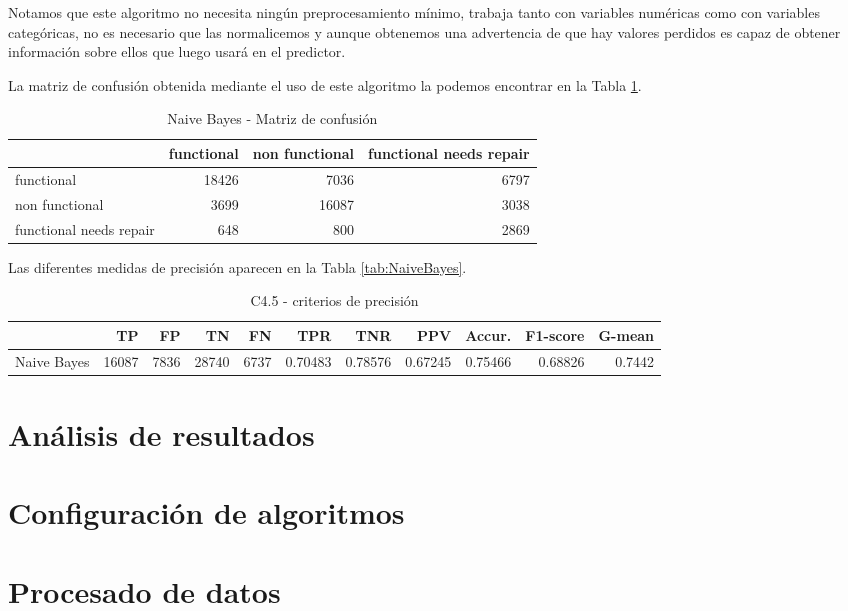 \documentclass[a4paper, 20pt]{article}
\begin{document}
Notamos que este algoritmo no necesita ningún preprocesamiento mínimo, trabaja tanto con variables numéricas como con variables categóricas, no es necesario que las normalicemos y aunque obtenemos una advertencia de que hay valores perdidos es capaz de obtener información sobre ellos que luego usará en el predictor.

La matriz de confusión obtenida mediante el uso de este algoritmo la podemos encontrar en la Tabla \ref{tab:CMNaiveBayes}.

\begin{table}[H]
\centering
  \caption{Naive Bayes - Matriz de confusión}
  \label{tab:CMNaiveBayes}
  \begin{tabular}{lrrr}
\toprule
    & functional & non functional & functional needs repair\\ \midrule
    functional & 18426 & 7036 & 6797\\
    non functional & 3699 & 16087 & 3038\\
    functional needs repair & 648 & 800 & 2869\\
    \bottomrule
  \end{tabular}
\end{table}

Las diferentes medidas de precisión aparecen en la Tabla \ref{tab:NaiveBayes}.
\begin{table}[H]
  \centering
  \caption{C4.5 - criterios de precisión}
  \label{tab:Tree}
  \begin{tabular}{lrrrrrrrrrr}
    \toprule
    & TP & FP & TN & FN & TPR & TNR & PPV & Accur. & F1-score & G-mean\\ \midrule
Naive Bayes & 16087 & 7836 & 28740 & 6737 & 0.70483 & 0.78576 & 0.67245 & 0.75466 & 0.68826 & 0.7442\\
\bottomrule
  \end{tabular}
\end{table}



\section{Análisis de resultados}


\section{Configuración de algoritmos}

\section{Procesado de datos}
\label{Preprocesado}
\end{document}
